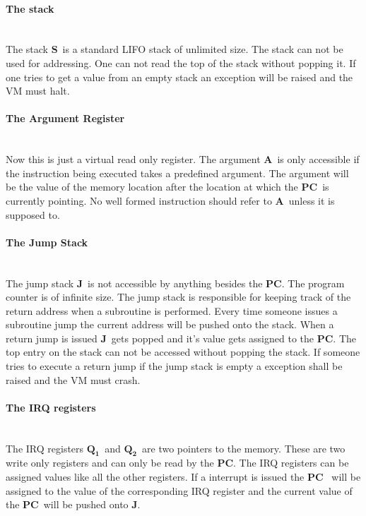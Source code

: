 \documentclass{article}
\newcommand{\s}{$\textbf{S}$}
\newcommand{\A}{$\textbf{A}$}
\newcommand{\q}{$\textbf{Q}_{\textbf{1}}$}
\newcommand{\qq}{$\textbf{Q}_{\textbf{2}}$}
\newcommand{\pc}{$\textbf{PC}$}
\newcommand{\J}{$\textbf{J}$}
\begin{document}
\paragraph{The stack} \
\\
The stack \s \ is a standard LIFO stack of unlimited size. The stack can not be
used for addressing. One can not read the top of the stack without popping it. If
one tries to get a value from an empty stack an exception will be raised and the
VM must halt.

\paragraph{The Argument Register} \
\\
Now this is just a virtual read only register. The argument \A \  is only
accessible if the instruction being executed takes a predefined argument. The
argument will be the value of the memory location after the location at which
the \pc \  is currently pointing. No well formed instruction should refer to
\A \ unless it is supposed to.

\paragraph{The Jump Stack} \
\\
The jump stack \J \ is not accessible by anything besides the \pc. The program
counter is of infinite size. The jump stack is responsible for keeping track
of the return address when a subroutine is performed. Every time someone
issues a subroutine jump the current address will be pushed onto the stack.
When a return jump is issued \J \ gets popped and it's value gets assigned to
the \pc. The top entry on the stack can not be accessed without popping the
stack.
If someone tries to execute a return jump if the jump stack is empty a exception
shall be raised and the VM must crash.

\paragraph{The IRQ registers} \
\\
The IRQ registers \q \ and \qq \ are two pointers to the memory. These are two
write only registers and can only be read by the \pc. The IRQ registers can be
assigned values like all the other registers.  If a interrupt is issued the \pc
\ will be assigned to the value of the corresponding IRQ register and the current
value of the \pc \ will be pushed onto \J.
\end{document}
